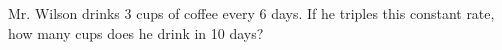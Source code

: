 Mr. Wilson drinks 3 cups of coffee every 6 days. If he triples this constant rate, how many cups does he drink in 10 days?
